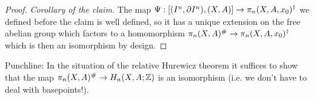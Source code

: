 \begin{proof}
\textit{Corollary of the claim.} The map $\Psi:[(I^n,\partial I^n),(X,A)]\to\pi_n(X,A,x_0)^\dagger$ we defined before the claim is well defined, so it has a unique extension on the free abelian group which factors to a homomorphism $\pi_n(X,A)^\#\to\pi_n(X,A,x_0)^\dagger$ which is then an isomorphism by design.
\end{proof}
 
Punchline: In the situation of the relative Hurewicz theorem it suffices to show that the map $\pi_n(X,A)^\#\to H_n(X,A;{\mathbb Z})$ is an isomorphism (i.e. we don't have to deal with basepoints!).
